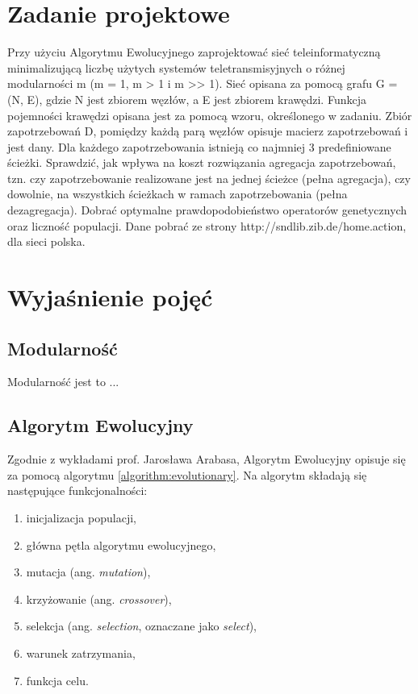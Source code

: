 \section{Zadanie projektowe}

Przy użyciu Algorytmu Ewolucyjnego zaprojektować sieć teleinformatyczną minimalizującą liczbę użytych systemów teletransmisyjnych o różnej modularności m (m = 1, m > 1 i m >> 1). Sieć opisana za pomocą grafu G = (N, E), gdzie N jest zbiorem węzłów, a E jest zbiorem krawędzi. Funkcja pojemności krawędzi opisana jest za pomocą wzoru, określonego w zadaniu. Zbiór zapotrzebowań D, pomiędzy każdą parą węzłów opisuje macierz zapotrzebowań i jest dany. Dla
każdego zapotrzebowania istnieją co najmniej 3 predefiniowane ścieżki. Sprawdzić,
jak wpływa na koszt rozwiązania agregacja zapotrzebowań, tzn. czy zapotrzebowanie realizowane jest na jednej ścieżce (pełna agregacja), czy dowolnie, na
wszystkich ścieżkach w ramach zapotrzebowania (pełna dezagregacja). Dobrać
optymalne prawdopodobieństwo operatorów genetycznych oraz liczność populacji. Dane pobrać ze strony http://sndlib.zib.de/home.action, dla sieci polska.

\section{Wyjaśnienie pojęć}
\label{section:explanation}

\subsection{Modularność}
Modularność jest to ... 

\subsection{Algorytm Ewolucyjny}

Zgodnie z wykładami prof. Jarosława Arabasa, Algorytm Ewolucyjny opisuje się za pomocą algorytmu \ref{algorithm:evolutionary}. Na algorytm składają się następujące funkcjonalności:
\begin{enumerate}
    \item inicjalizacja populacji,
    \item główna pętla algorytmu ewolucyjnego,
    \item mutacja (ang. \textit{mutation}),
    \item krzyżowanie (ang. \textit{crossover}),
    \item selekcja (ang. \textit{selection}, oznaczane jako \textit{select}),
    \item warunek zatrzymania,
    \item funkcja celu.
\end{enumerate}

